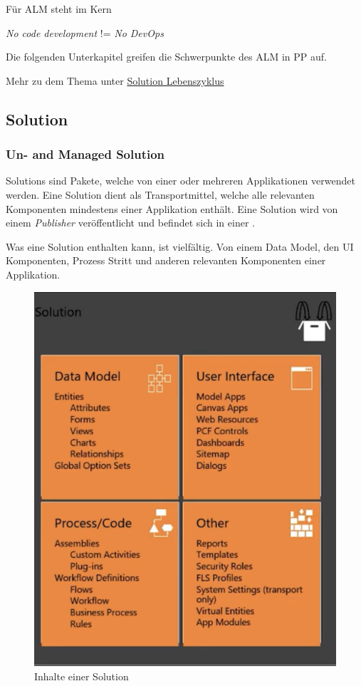 Für \gls{ALM} steht im Kern
\begin{center}
	\textit{No code development} != \textit{No DevOps}
\end{center}

Die folgenden Unterkapitel greifen die Schwerpunkte des \gls{ALM} in \gls{PP} auf.

Mehr zu dem Thema unter \href{https://docs.microsoft.com/de-de/power-platform/alm/solution-concepts-alm#solution-publisher}{Solution Lebenszyklus}  
\subsection{Solution}
\subsubsection{Un- and Managed Solution}
Solutions sind Pakete, welche von einer oder mehreren Applikationen verwendet werden. Eine Solution dient als Transportmittel, welche alle relevanten Komponenten mindestens einer Applikation enthält. Eine Solution wird von einem \textit{Publisher} veröffentlicht und befindet sich in einer \Env. 

Was eine Solution enthalten kann, ist vielfältig. Von einem Data Model, den \gls{UI} Komponenten, Prozess Stritt und anderen relevanten Komponenten einer Applikation.
\begin{figure}[H]
	\centering
	\includegraphics[scale = 0.3]{attachment/chapter_13/Scc028}
	\caption{Inhalte einer Solution} 
\end{figure}

